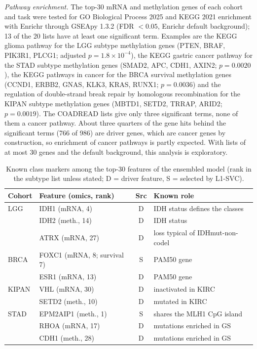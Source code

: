 \documentclass[conference]{IEEEtran}
\begin{document}
\emph{Pathway enrichment.} The top-30 mRNA and methylation genes of each cohort and task were tested for GO Biological
Process 2025 and KEGG 2021 enrichment with Enrichr through GSEApy 1.3.2 \cite{kuleshov2016enrichr,fang2023gseapy}
(FDR $<0.05$, Enrichr default background); 13 of the 20 lists have at least one significant term. Examples are the KEGG
glioma pathway for the LGG subtype methylation genes (PTEN, BRAF, PIK3R1, PLCG1; adjusted $p=1.8\times10^{-4}$), the
KEGG gastric cancer pathway for the STAD subtype methylation genes (SMAD2, APC, CDH1, AXIN2; $p=0.0020$), the KEGG
pathways in cancer for the BRCA survival methylation genes (CCND1, ERBB2, GNAS, KLK3, KRAS, RUNX1; $p=0.0036$) and
the regulation of double-strand break repair by homologous recombination for the KIPAN subtype methylation genes
(MBTD1, SETD2, TRRAP, ARID2; $p=0.0019$). The COADREAD lists give only three significant terms, none of them a cancer
pathway. About three quarters of the gene hits behind the significant terms (766 of 986)
are driver genes, which are cancer genes by construction, so enrichment of cancer pathways is partly expected. With lists of at most 30 genes and the default
background, this analysis is exploratory.

\begin{table}[t]
\centering
\caption{Known class markers among the top-30 features of the ensembled model (rank in the subtype list unless stated;
D = driver feature, S = selected by L1-SVC).}
\label{tab:bio}
\footnotesize
\setlength{\tabcolsep}{3pt}
\begin{tabular}{@{}l l c p{3.6cm}@{}}
\toprule
Cohort & Feature (omics, rank) & Src & Known role \\
\midrule
LGG      & IDH1 (mRNA, 4)                    & D & IDH status defines the classes \cite{tcga2015lgg} \\
         & IDH2 (meth., 14)                  & D & IDH status \cite{tcga2015lgg} \\
         & ATRX (mRNA, 27)                   & D & loss typical of IDHmut-non-codel \cite{tcga2015lgg} \\
BRCA     & FOXC1 (mRNA, 8; survival 7)       & S & PAM50 gene \cite{parker2009pam50} \\
         & ESR1 (mRNA, 13)                   & D & PAM50 gene \cite{parker2009pam50} \\
KIPAN    & VHL (mRNA, 30)                    & D & inactivated in KIRC \cite{tcga2013kirc} \\
         & SETD2 (meth., 10)                 & D & mutated in KIRC \cite{tcga2013kirc} \\
STAD     & EPM2AIP1 (meth., 1)             & S & shares the MLH1 CpG island \cite{damaso2018mlh1} \\
         & RHOA (mRNA, 17)                   & D & mutations enriched in GS \cite{tcga2014stad} \\
         & CDH1 (meth., 28)                  & D & mutations enriched in GS \cite{tcga2014stad} \\
\bottomrule
\end{tabular}
\end{table}
\end{document}
